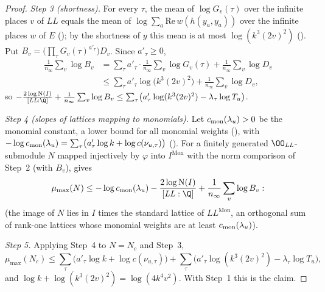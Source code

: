 \begin{proof}
\emph{Step 3 (shortness).} For every $\tau$, the mean of $\log G_v(\tau)$ over the infinite places $v$ of $\mathit{LL}$
equals the mean of $\log\sum_a\mathrm{Re}\,w(h(y_a,y_a))$ over the infinite places $w$ of $E$
(); by
the shortness of $y$ this mean is at most $\log(k^3(2v)^2)$
(). Put
$B_v=\bigl(\prod_\tau G_v(\tau)^{a'_\tau}\bigr)D_v$. Since $a'_\tau\ge0$,
\begin{align*}
\frac1{n_\infty}\sum_v\log B_v&=\sum_\tau a'_\tau\cdot\frac1{n_\infty}\sum_v\log G_v(\tau)+\frac1{n_\infty}\sum_v\log D_v\\
&\le\sum_\tau a'_\tau\log\bigl(k^3(2v)^2\bigr)+\frac1{n_\infty}\sum_v\log D_v,
\end{align*}
so $-\frac{2\log\mathrm N(I)}{[\mathit{LL}:\Q]}+\frac1{n_\infty}\sum_v\log B_v\le\sum_\tau\bigl(a'_\tau\log(k^3(2v)^2)-
\lambda_\tau\log T_u\bigr)$.

\emph{Step 4 (slopes of lattices mapping to monomials).} Let $c_{\rm mon}(\lambda_u)>0$ be the monomial constant, a
lower bound for all monomial weights (),
with $-\log c_{\rm mon}(\lambda_u)=\sum_\tau\bigl(a'_\tau\log k+\log c(\nu_{u,\tau})\bigr)$
(). For a finitely generated
$\OO_{\mathit{LL}}$-submodule $N$ mapped injectively by $\varphi$ into $I^{\mathrm{Mon}}$ with the norm comparison of Step~2
(with $B_v$),  gives
\[
\mu_{\max}(N)\le-\log c_{\rm mon}(\lambda_u)-\frac{2\log\mathrm N(I)}{[\mathit{LL}:\Q]}+\frac1{n_\infty}\sum_v\log B_v :
\]
(the image of $N$ lies in $I$ times the standard lattice of $\mathit{LL}^{\mathrm{Mon}}$, an orthogonal sum of rank-one
lattices whose monomial weights are at least $c_{\rm mon}(\lambda_u)$).

\emph{Step 5.} Applying Step~4 to $N=N_c$ and Step~3,
\[
\mu_{\max}(N_c)\le\sum_\tau\bigl(a'_\tau\log k+\log c(\nu_{u,\tau})\bigr)+\sum_\tau\bigl(a'_\tau\log(k^3(2v)^2)-\lambda_\tau
\log T_u\bigr),
\]
and $\log k+\log(k^3(2v)^2)=\log(4k^4v^2)$. With Step~1 this is the claim.
\end{proof}

